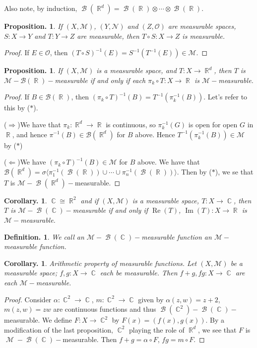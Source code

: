 \documentclass[11pt, a4paper]{memoir}
\DeclareMathOperator{\R}{{\mathbb{R}}}
\DeclareMathOperator{\C}{{\mathbb{C}}}
\newcommand{\impr}{{($\Rightarrow$)\hspace{0.2cm}}}
\newcommand{\impl}{{($\Leftarrow$)\hspace{0.2cm}}}
\theoremstyle{change}
\newtheorem{corollary}[theorem]{Corollary.}
\newtheorem{proposition}[theorem]{Proposition.}
\theoremstyle{plain}
\theoremstyle{nonumberplain}
\newtheorem{definition}{Definition.}
\newtheorem{proof}{Proof}
\DeclareMathOperator{\M}{{\mathcal{M}}}
\DeclareMathOperator{\B}{{\mathcal{B}}}
\renewcommand{\Re}{\ensuremath{\operatorname{Re}}}
\renewcommand{\Im}{\ensuremath{\operatorname{Im}}}
\numberwithin{equation}{section}
\begin{document}
Also note, by induction, $\B(\R^d)=\B(\R)\otimes\cdots\otimes\B(\R)$.
\begin{proposition}
    If $(X,\mathcal{M})$, $(Y,\mathcal{N})$ and $(Z,\mathcal{O})$ are measurable spaces, $S:X\to Y$ and $T:Y\to Z$ are measurable, then $T\circ S:X\to Z$ is measurable.
\end{proposition}
\begin{proof}
    If $E\in\mathcal{O}$, then $(T\circ S)^{-1}(E)=S^{-1}(T^{-1}(E))\in\mathcal{M}$.
\end{proof}
\begin{proposition}
    If $(X,\mathcal{M})$ is a measurable space, and $T:X\to\R^d$, then $T$ is $\mathcal{M}-\mathcal{B}(\R)-$measurable if and only if each $\pi_k\circ T:X\to\R$ is $\mathcal{M}-$measurable.
\end{proposition}
\begin{proof}
    If $B\in\mathcal{B}(\R)$, then $(\pi_k\circ T)^{-1}(B)=T^{-1}(\pi_k^{-1}(B))$.
    Let's refer to this by ($*$).

    \impr We have that $\pi_k:\R^d\to\R$ is continuous, so $\pi_k^{-1}(G)$ is open for open $G$ in $\R$, and hence $\pi^{-1}(B)\in\mathcal{B}(\R^d)$ for $B$ above.
    Hence $T^{-1}(\pi_k^{-1}(B))\in\mathcal{M}$ by ($*$)

    \impl We have $(\pi_k\circ T)^{-1}(B)\in\mathcal{M}$ for $B$ above.
    We have that $\mathcal{B}(\R^d)=\sigma\langle\pi_1^{-1}(\B(\R))\cup\cdots\cup\pi_n^{-1}(\B(\R))\rangle$.
    Then by ($*$), we se that $T$ is $\mathcal{M}-\B(\R^d)-$measurable.
\end{proof}
\begin{corollary}
    $\C\cong\R^2$ and if $(X,\mathcal{M})$ is a measurable space, $T:X\to\C$, then $T$ is $\mathcal{M}-\B(\C)-$measurable if and only if $\Re(T)$, $\Im(T):X\to\R$ is $\mathcal{M}-$measurable.
\end{corollary}
\begin{definition}
    We call an $\mathcal{M}-\B(\C)-$measurable function an $\mathcal{M}-$measurable function.
\end{definition}
\begin{corollary}
    Arithmetic property of measurable functions.
    Let $(X,\mathcal{M})$ be a measurable space; $f,g:X\to\C$ each be measurable.
    Then $f+g,fg:X\to\C$ are each $\mathcal{M}-$measurable.
\end{corollary}
\begin{proof}
    Consider $\alpha:\C^2\to\C$, $m:\C^2\to\C$ given by $\alpha(z,w)=z+2$, $m(z,w)=zw$ are continuous functions and thus $\B(\C^2)-\B(\C)-$measurable.
    We define $F:X\to\C^2$ by $F(x)=(f(x),g(x))$.
    By a modification of the last proposition, $\C^2$ playing the role of $\R^d$, we see that $F$ is $\M-\B(\C)-$measurable.
    Then $f+g=\alpha\circ F$, $fg=m\circ F$.
\end{proof}
\end{document}
